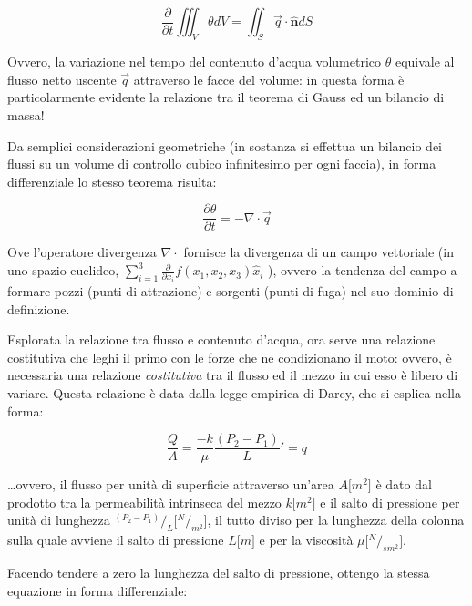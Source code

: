 \documentclass[11pt]{amsart}
\theoremstyle{definition}
\theoremstyle{remark}
\numberwithin{equation}{section}
\newcommand*\rfrac[2]{{}^{#1}\!/_{#2}}
\begin{document}
\begin{equation} 
\label{eqn:gauss_int}
\frac{\partial }{\partial t} \iiint_{V} \theta dV = \iint_{S} \vec{q}\cdot\mathbf{\hat{n}}dS
\end{equation}

Ovvero, la variazione nel tempo del contenuto d'acqua volumetrico $\theta$ equivale al flusso netto uscente $\vec{q}$ attraverso le facce del volume: in questa forma
è particolarmente evidente la relazione tra il teorema di Gauss ed un bilancio di massa!

Da semplici considerazioni geometriche (in sostanza si effettua un bilancio dei flussi su un volume di controllo cubico infinitesimo per ogni faccia), in forma differenziale lo stesso teorema risulta:

\begin{equation}
\label{eqn:gauss_dif}
\frac{\partial \theta}{\partial t} = - \nabla\cdot\vec{q} 
\end{equation}

Ove l'operatore divergenza $\nabla \cdot $ fornisce la divergenza di un campo vettoriale (in uno spazio euclideo, 
$\sum_{i=1}^{3}\frac{\partial}{\partial x_{i}}f(x_{1},x_{2},x_{3})\hat{x}_{i} $ ), ovvero la tendenza del campo a formare pozzi (punti
di attrazione) e sorgenti (punti di fuga) nel suo dominio di definizione. 



Esplorata la relazione tra flusso e contenuto d'acqua, ora serve una relazione costitutiva che leghi il primo con le forze che ne condizionano il moto: ovvero,
è necessaria una relazione \emph{costitutiva} tra il flusso ed il mezzo in cui esso è libero di variare. 
Questa relazione è data dalla legge empirica di Darcy, che si esplica nella forma:

\begin{equation}
\label{eqn:darcy_int}
\frac{Q}{A}=\frac{-k}{\mu} \frac{(P_2 - P_1)}{L}' = q
\end{equation}

\dots ovvero, il flusso per unità di superficie attraverso un'area $A \lbrack m^{2} \rbrack$ è dato dal prodotto tra la permeabilità intrinseca del mezzo $k 
\lbrack m^{2} \rbrack$ e il salto di pressione per unità di lunghezza $\rfrac{(P_2 - P_1)}{L} \lbrack \rfrac{N}{m^{2}} \rbrack$, il tutto diviso per la lunghezza 
della colonna sulla quale avviene il salto di pressione $L \lbrack m \rbrack$ e per la viscosità $\mu \lbrack \rfrac{N}{sm^{2}} \rbrack$. 

Facendo tendere a zero la lunghezza del salto di pressione, ottengo la stessa equazione in forma differenziale:
\end{document}
